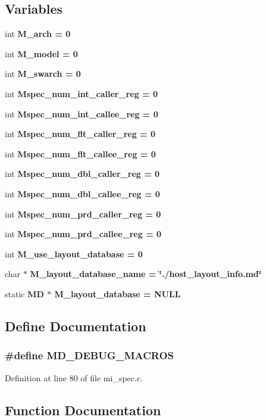 \subsection*{Variables}
\begin{CompactItemize}
\item 
int \bf{M\_\-arch} = 0
\item 
int \bf{M\_\-model} = 0
\item 
int \bf{M\_\-swarch} = 0
\item 
int \bf{Mspec\_\-num\_\-int\_\-caller\_\-reg} = 0
\item 
int \bf{Mspec\_\-num\_\-int\_\-callee\_\-reg} = 0
\item 
int \bf{Mspec\_\-num\_\-flt\_\-caller\_\-reg} = 0
\item 
int \bf{Mspec\_\-num\_\-flt\_\-callee\_\-reg} = 0
\item 
int \bf{Mspec\_\-num\_\-dbl\_\-caller\_\-reg} = 0
\item 
int \bf{Mspec\_\-num\_\-dbl\_\-callee\_\-reg} = 0
\item 
int \bf{Mspec\_\-num\_\-prd\_\-caller\_\-reg} = 0
\item 
int \bf{Mspec\_\-num\_\-prd\_\-callee\_\-reg} = 0
\item 
int \bf{M\_\-use\_\-layout\_\-database} = 0
\item 
char $\ast$ \bf{M\_\-layout\_\-database\_\-name} = \char`\"{}./host\_\-layout\_\-info.md\char`\"{}
\item 
static \bf{MD} $\ast$ \bf{M\_\-layout\_\-database} = \bf{NULL}
\end{CompactItemize}


\subsection{Define Documentation}
\subsubsection{\setlength{\rightskip}{0pt plus 5cm}\#define \bf{MD\_\-DEBUG\_\-MACROS}}\label{mi__spec_8c_e7f9e74008b6fd5aacf14ed3e9c8bdf2}




Definition at line 80 of file mi\_\-spec.c.

\subsection{Function Documentation}
